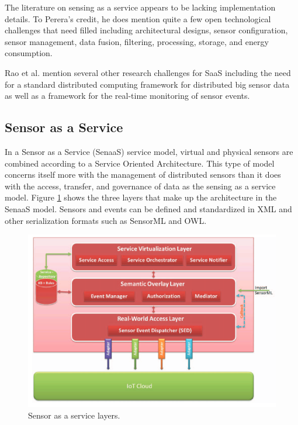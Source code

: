 \documentclass[]{article}
\begin{document}
The literature on sensing as a service appears to be lacking implementation details. To Perera's credit, he does mention quite a few open technological challenges that need filled including architectural designs, sensor configuration, sensor management, data fusion, filtering, processing, storage, and energy consumption.

Rao et al.\cite{rao_cloud_2012} mention several other research challenges for SaaS including the need for a standard distributed computing framework for distributed big sensor data as well as a framework for the real-time monitoring of sensor events.

\subsection{Sensor as a Service} \label{ssec:sensor-as-a-service}
In a Sensor as a Service (SenaaS) \cite{alam_senaas_2010} service model, virtual and physical sensors are combined according to a Service Oriented Architecture. This type of model concerns itself more with the management of distributed sensors than it does with the access, transfer, and governance of data as the sensing as a service model\cite{zaslavsky_sensing_2013}. Figure \ref{fig:sensor-as-a-service} shows the three layers that make up the architecture in the SenaaS model. Sensors and events can be defined and standardized in XML and other serialization formats such as SensorML\cite{sensorml} and OWL\cite{dean_owl_2004}.

\begin{figure}
    \centering
    \includegraphics[width=1.0\linewidth]{img/sensor-as-a-service}
    \caption[Sensor as a service layers.]{Sensor as a service layers.\cite{alam_senaas_2010}}
    \label{fig:sensor-as-a-service}
\end{figure}
\end{document}
